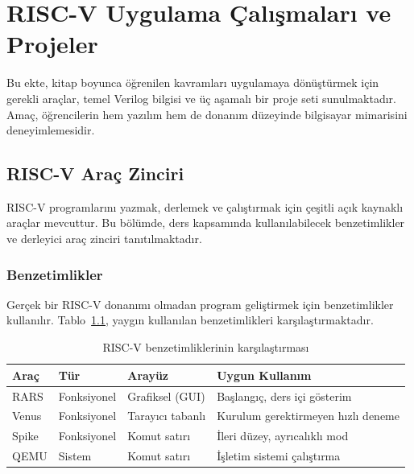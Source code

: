 \chapter{RISC-V Uygulama Çalışmaları ve Projeler}
\label{app:pratik-rehber}

Bu ekte, kitap boyunca öğrenilen kavramları uygulamaya dönüştürmek için gerekli araçlar, temel Verilog bilgisi ve üç aşamalı bir proje seti sunulmaktadır. Amaç, öğrencilerin hem yazılım hem de donanım düzeyinde bilgisayar mimarisini deneyimlemesidir.

\section{RISC-V Araç Zinciri}
\label{sec:ekd-arac-zinciri}

RISC-V programlarını yazmak, derlemek ve çalıştırmak için çeşitli açık kaynaklı araçlar mevcuttur. Bu bölümde, ders kapsamında kullanılabilecek benzetimlikler ve derleyici araç zinciri tanıtılmaktadır.

\subsection{Benzetimlikler}
\label{sec:ekd-simulatorler}

Gerçek bir RISC-V donanımı olmadan program geliştirmek için benzetimlikler kullanılır. Tablo~\ref{tab:ekd-simulatorler}, yaygın kullanılan benzetimlikleri karşılaştırmaktadır.

\begin{table}[H]
\centering
\caption[RISC-V benzetimliklerinin karşılaştırması]{RISC-V benzetimliklerinin karşılaştırması}
\label{tab:ekd-simulatorler}
\begin{tabular}{@{}llll@{}}
\toprule
\textbf{Araç} & \textbf{Tür} & \textbf{Arayüz} & \textbf{Uygun Kullanım} \\
\midrule
RARS   & Fonksiyonel & Grafiksel (GUI)       & Başlangıç, ders içi gösterim \\
Venus  & Fonksiyonel & Tarayıcı tabanlı      & Kurulum gerektirmeyen hızlı deneme \\
Spike  & Fonksiyonel & Komut satırı          & İleri düzey, ayrıcalıklı mod \\
QEMU   & Sistem      & Komut satırı          & İşletim sistemi çalıştırma \\
\bottomrule
\end{tabular}
\end{table}


